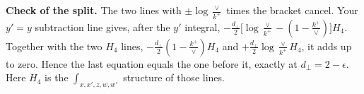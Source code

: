 \documentclass[10pt]{article}
\newcommand{\new}[1]{{\color{blue}#1}}
\begin{document}
\new{\noindent\textbf{Check of the split.} The two lines with $\pm\log\frac{\vee}{k^+}$ times the bracket cancel. Your $y'=y$ subtraction line gives, after the $y'$ integral, $-\frac{d_\perp}{2}\big[\log\frac{\vee}{k^+}-(1-\frac{k^+}{\vee})\big]H_4$. Together with the two $H_4$ lines, $-\frac{d_\perp}{2}(1-\frac{k^+}{\vee})H_4$ and $+\frac{d_\perp}{2}\log\frac{\vee}{k^+}H_4$, it adds up to zero. Hence the last equation equals the one before it, exactly at $d_\perp=2-\epsilon$. Here $H_4$ is the $\int_{x,x',z,w,w'}$ structure of those lines.}
\end{document}
